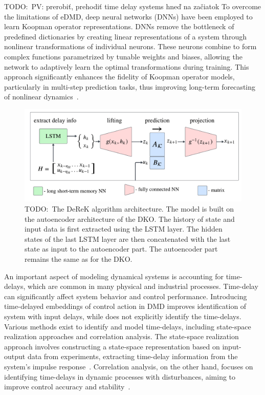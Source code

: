 \documentclass[conference]{IEEEtran}
\newcommand{\todo}[1]{{{\color{red} TODO:~#1	}} }
\begin{document}
\todo{PV: prerobiť, prehodiť time delay systems hneď na začiatok} To overcome the limitations of eDMD, deep neural networks (DNNs) have been employed to learn Koopman operator representations. DNNs remove the bottleneck of predefined dictionaries by creating linear representations of a system through nonlinear transformations of individual neurons. These neurons combine to form complex functions parametrized by tunable weights and biases, allowing the network to adaptively learn the optimal transformations during training. This approach significantly enhances the fidelity of Koopman operator models, particularly in multi-step prediction tasks, thus improving long-term forecasting of nonlinear dynamics~\cite{Yeung2019}.
\begin{figure}\label{fig:derek_scheme}
    \centerline{\includegraphics[width = \linewidth]{figures/derek_scheme.pdf}}
    \caption{\todo{The DeReK algorithm architecture. The model is built on the autoencoder architecture of the DKO. The history of state and input data is first extracted using the LSTM layer. The hidden states of the last LSTM layer are then concatenated with the last state as input to the autoencoder part. The autoencoder part remains the same as for the DKO.}}
\end{figure}
An important aspect of modeling dynamical systems is accounting for time-delays, which are common in many physical and industrial processes. Time-delay can significantly affect system behavior and control performance. Introducing time-delayed embeddings of control action in DMD improves identification of system with input delays, while does not explicitly identify the time-delays. Various methods exist to identify and model time-delays, including state-space realization approaches and correlation analysis. The state-space realization approach involves constructing a state-space representation based on input-output data from experiments, extracting time-delay information from the system's impulse response~\cite{Lima2015254}. Correlation analysis, on the other hand, focuses on identifying time-delays in dynamic processes with disturbances, aiming to improve control accuracy and stability~\cite{Li201792}.
\end{document}

